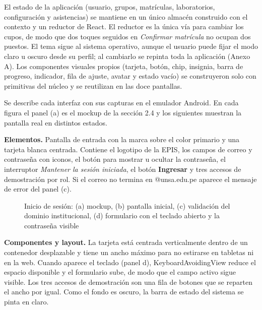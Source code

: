 \vspace{0.2cm}

El estado de la aplicación (usuario, grupos, matrículas, laboratorios, configuración y asistencias) se mantiene en un único almacén construido con el contexto y un reductor de React. El reductor es la única vía para cambiar los cupos, de modo que dos toques seguidos en \textit{Confirmar matrícula} no ocupan dos puestos. El tema sigue al sistema operativo, aunque el usuario puede fijar el modo claro u oscuro desde su perfil; al cambiarlo se repinta toda la aplicación (Anexo A). Los componentes visuales propios (tarjeta, botón, chip, insignia, barra de progreso, indicador, fila de ajuste, avatar y estado vacío) se construyeron solo con primitivas del núcleo y se reutilizan en las doce pantallas.

\vspace{0.2cm}

Se describe cada interfaz con sus capturas en el emulador Android. En cada figura el panel (a) es el mockup de la sección 2.4 y los siguientes muestran la pantalla real en distintos estados.


\textbf{Elementos.} Pantalla de entrada con la marca sobre el color primario y una tarjeta blanca centrada. Contiene el logotipo de la EPIS, los campos de correo y contraseña con iconos, el botón para mostrar u ocultar la contraseña, el interruptor \textit{Mantener la sesión iniciada}, el botón \textbf{Ingresar} y tres accesos de demostración por rol. Si el correo no termina en @unsa.edu.pe aparece el mensaje de error del panel (c).

\begin{figure}[!htbp]
\centering
{}
\caption{Inicio de sesión: (a) mockup, (b) pantalla inicial, (c) validación del dominio institucional, (d) formulario con el teclado abierto y la contraseña visible}
\label{fig:i01}
\end{figure}

\textbf{Componentes y layout.} La tarjeta está centrada verticalmente dentro de un contenedor desplazable y tiene un ancho máximo para no estirarse en tabletas ni en la web. Cuando aparece el teclado (panel d), KeyboardAvoidingView reduce el espacio disponible y el formulario sube, de modo que el campo activo sigue visible. Los tres accesos de demostración son una fila de botones que se reparten el ancho por igual. Como el fondo es oscuro, la barra de estado del sistema se pinta en claro.

